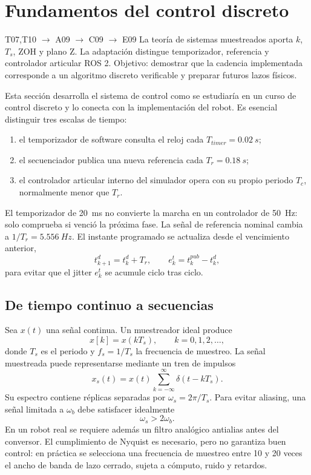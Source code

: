 \documentclass[11pt,letterpaper]{article}
\begin{document}
\section{Fundamentos del control discreto}
\label{sec:discrete-control}
\begin{tracebox}{T07,T10 $\rightarrow$ A09 $\rightarrow$ C09 $\rightarrow$ E09}
La teoría de sistemas muestreados aporta $k$, $T_s$, ZOH y plano Z. La
adaptación distingue temporizador, referencia y controlador articular ROS 2.
Objetivo: demostrar que la cadencia implementada corresponde a un algoritmo
discreto verificable y preparar futuros lazos físicos.
\end{tracebox}
Esta sección desarrolla el sistema de control como se estudiaría en un curso de
control discreto y lo conecta con la implementación del robot. Es esencial
distinguir tres escalas de tiempo:
\begin{enumerate}
 \item el temporizador de software consulta el reloj cada $T_{timer}=\SI{0.02}{s}$;
 \item el secuenciador publica una nueva referencia cada $T_r=\SI{0.18}{s}$;
 \item el controlador articular interno del simulador opera con su propio
 periodo $T_c$, normalmente menor que $T_r$.
\end{enumerate}
El temporizador de \SI{20}{ms} no convierte la marcha en un controlador de
\SI{50}{Hz}: solo comprueba si venció la próxima fase. La señal de referencia
nominal cambia a $1/T_r=\SI{5.556}{Hz}$. El instante programado se actualiza
desde el vencimiento anterior,
\begin{equation}
 t_{k+1}^{d}=t_k^{d}+T_r,
 \qquad e_k^t=t_k^{pub}-t_k^d,
 \label{eq:deadline}
\end{equation}
para evitar que el jitter $e_k^t$ se acumule ciclo tras ciclo.

\subsection{De tiempo continuo a secuencias}
Sea $x(t)$ una señal continua. Un muestreador ideal produce
\begin{equation}
 x[k]=x(kT_s),\qquad k=0,1,2,\ldots,
 \label{eq:sampling}
\end{equation}
donde $T_s$ es el periodo y $f_s=1/T_s$ la frecuencia de muestreo. La señal
muestreada puede representarse mediante un tren de impulsos
\begin{equation}
 x_s(t)=x(t)\sum_{k=-\infty}^{\infty}\delta(t-kT_s).
\end{equation}
Su espectro contiene réplicas separadas por $\omega_s=2\pi/T_s$. Para evitar
aliasing, una señal limitada a $\omega_b$ debe satisfacer idealmente
\begin{equation}
 \omega_s>2\omega_b.
 \label{eq:nyquist}
\end{equation}
En un robot real se requiere además un filtro analógico antialias antes del
conversor. El cumplimiento de Nyquist es necesario, pero no garantiza buen
control: en práctica se selecciona una frecuencia de muestreo entre 10 y 20
veces el ancho de banda de lazo cerrado, sujeta a cómputo, ruido y retardos.
\end{document}
